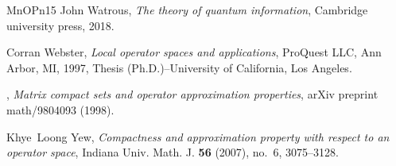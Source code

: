 \documentclass[11pt]{amsart}
\numberwithin{equation}{section}
\begin{document}
\begin{thebibliography}{MnOPn15}
John Watrous, \emph{The theory of quantum information}, Cambridge university
  press, 2018.

Corran Webster, \emph{Local operator spaces and applications}, ProQuest LLC,
  Ann Arbor, MI, 1997, Thesis (Ph.D.)--University of California, Los Angeles.

\bysame, \emph{Matrix compact sets and operator approximation properties},
  arXiv preprint math/9804093 (1998).

Khye~Loong Yew, \emph{Compactness and approximation property with respect to an
  operator space}, Indiana Univ. Math. J. \textbf{56} (2007), no.~6,
  3075--3128. 

\end{thebibliography}
\end{document}
